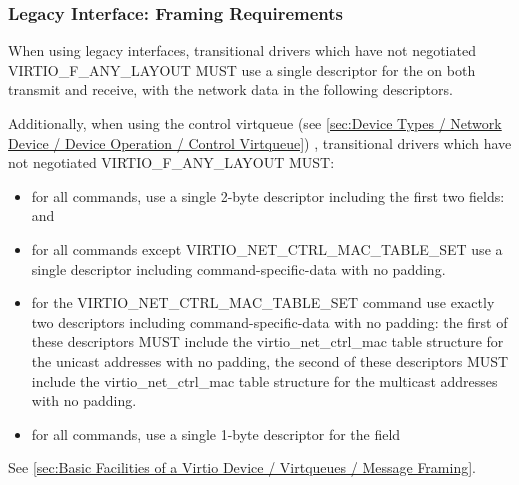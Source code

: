 \subsubsection{Legacy Interface: Framing Requirements}\label{sec:Device
Types / Network Device / Legacy Interface: Framing Requirements}

When using legacy interfaces, transitional drivers which have not
negotiated VIRTIO_F_ANY_LAYOUT MUST use a single descriptor for the
 on both transmit and receive, with the
network data in the following descriptors.

Additionally, when using the control virtqueue (see \ref{sec:Device
Types / Network Device / Device Operation / Control Virtqueue})
, transitional drivers which have not
negotiated VIRTIO_F_ANY_LAYOUT MUST:
\begin{itemize}
\item for all commands, use a single 2-byte descriptor including the first two
fields:  and 
\item for all commands except VIRTIO_NET_CTRL_MAC_TABLE_SET
use a single descriptor including command-specific-data
with no padding.
\item for the VIRTIO_NET_CTRL_MAC_TABLE_SET command use exactly
two descriptors including command-specific-data with no padding:
the first of these descriptors MUST include the
virtio_net_ctrl_mac table structure for the unicast addresses with no padding,
the second of these descriptors MUST include the
virtio_net_ctrl_mac table structure for the multicast addresses
with no padding.
\item for all commands, use a single 1-byte descriptor for the
 field
\end{itemize}

See \ref{sec:Basic
Facilities of a Virtio Device / Virtqueues / Message Framing}.
